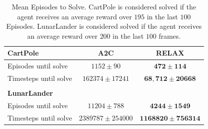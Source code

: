 \documentclass{article}
\begin{document}

\begin{table}[h]
\centering
\begin{tabular}{l c c} 
\textbf{CartPole} & A2C & RELAX \\\midrule
Episodes until solve      & $1152 \pm 90$ & $\bm{472 \pm 114}$ \\
Timesteps until solve    & $162374 \pm 17241$ & $\bm{68,712 \pm 20668}$ \\\\
\textbf{LunarLander}\\ \midrule
Episodes until solve & $11204 \pm 788$ & $\bm{4244 \pm 1549}$ \\
Timesteps until solve & $2389787 \pm 254000$ & $\bm{1168820 \pm 756314}$
\end{tabular}
\caption{Mean Episodes to Solve. CartPole is considered solved if the agent receives an average reward over $195$ in the last $100$ Episodes. LunarLander is considered solved if the agent receives an average reward over $200$ in the last $100$ frames.}
\label{tab:disc_rl}
\end{table}
\end{document}
